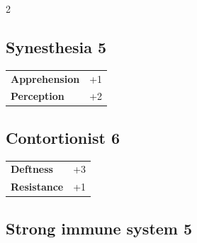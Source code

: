 \begin{multicols}{2}
\begin{tcolorbox}

\end{tcolorbox}

\begin{tcolorbox}
    \subsection*{Synesthesia \hfill \small{5 }}
    \tcblower




\begin{tabular}{@{}ll@{}}
    \textbf{Apprehension} & +1\\
    \textbf{Perception} & +2\\
\end{tabular}


\end{tcolorbox}

\begin{tcolorbox}
    \subsection*{Contortionist \hfill \small{6 }}
    \tcblower




\begin{tabular}{@{}ll@{}}
    \textbf{Deftness} & +3\\
    \textbf{Resistance} & +1\\
\end{tabular}


\end{tcolorbox}

\begin{tcolorbox}
    \subsection*{Strong immune system \hfill \small{5 }}
    \tcblower





\end{tcolorbox}
\end{multicols}
